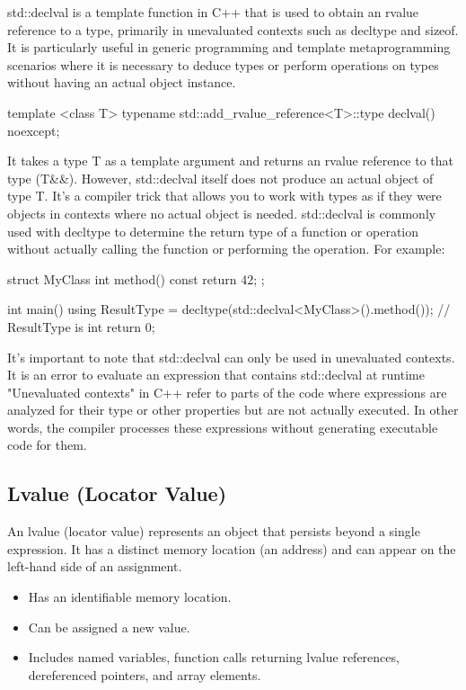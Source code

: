 \documentclass{report}
\begin{document}
\pagebreak 
{}
\bigbreak \noindent 
std::declval is a template function in C++ that is used to obtain an rvalue reference to a type, primarily in unevaluated contexts such as decltype and sizeof. It is particularly useful in generic programming and template metaprogramming scenarios where it is necessary to deduce types or perform operations on types without having an actual object instance.
\bigbreak \noindent 
\begin{cppcode}
template <class T>
typename std::add_rvalue_reference<T>::type declval() noexcept;
\end{cppcode}
\bigbreak \noindent 
It takes a type T as a template argument and returns an rvalue reference to that type (T\&\&). However, std::declval itself does not produce an actual object of type T. It's a compiler trick that allows you to work with types as if they were objects in contexts where no actual object is needed.
\bigbreak \noindent 
std::declval is commonly used with decltype to determine the return type of a function or operation without actually calling the function or performing the operation. For example:
\bigbreak \noindent 
\begin{cppcode}
    struct MyClass {
        int method() const { return 42; }
    };

    int main() {
        using ResultType = decltype(std::declval<MyClass>().method());
        // ResultType is int
        return 0;
    }
\end{cppcode}
\bigbreak \noindent 
It's important to note that std::declval can only be used in unevaluated contexts. It is an error to evaluate an expression that contains std::declval at runtime
\bigbreak \noindent 
"Unevaluated contexts" in C++ refer to parts of the code where expressions are analyzed for their type or other properties but are not actually executed. In other words, the compiler processes these expressions without generating executable code for them.


\pagebreak 
{}
\bigbreak \noindent 
\subsection{Lvalue (Locator Value)}
\bigbreak \noindent 
An lvalue (locator value) represents an object that persists beyond a single expression. It has a distinct memory location (an address) and can appear on the left-hand side of an assignment.
\bigbreak \noindent 
\begin{itemize}
    \item Has an identifiable memory location.
    \item Can be assigned a new value.
    \item Includes named variables, function calls returning lvalue references, dereferenced pointers, and array elements.
\end{itemize}
\end{document}
